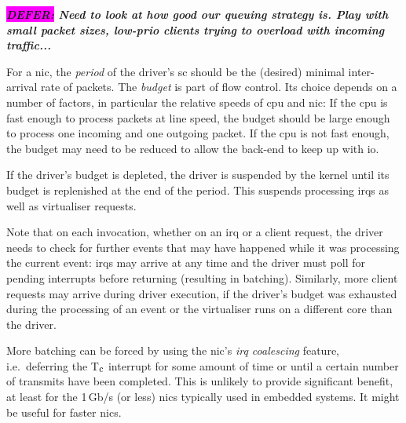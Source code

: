 \documentclass[a4paper,12pt]{report}
\newcommand{\Comment}[1]{\textbf{\textsl{#1}}}
\newcommand{\DEFER}[1]{\textbf{\textsl{\colorbox{magenta}{DEFER:} #1}}}
\newcommand{\Comment}[1]{\relax}
\newcommand{\DEFER}[1]{\relax}
\newcommand{\gernot}[1]{\Comment{#1 \colorbox{yellow}{[gernot]}}}
\newcommand{\peterc}[1]{\Comment{#1 \colorbox{yellow}{[peterc]}}}
\newcommand{\Ra}{R\(_{\mbox{\footnotesize a}}\)\xspace}
\newcommand{\Tc}{T\(_{\mbox{\footnotesize c}}\)\xspace}
\begin{document}
\DEFER{Need to look at how good our queuing strategy is. Play with
  small packet sizes, low-prio clients trying to overload with
  incoming traffic...}

For a \gls{nic}, the \emph{period} of the driver's \gls{sc} should be the (desired) minimal
inter-arrival rate of packets.
The \emph{budget} is part of flow
control. Its choice depends on a number of factors, in particular the
relative speeds of \gls{cpu} and \gls{nic}: If the \gls{cpu} is fast enough to process
packets at line speed, the budget should be large enough to process
one incoming and one outgoing packet. If the \gls{cpu} is not fast enough,
the budget may need to be reduced to allow the back-end to keep up
with \gls{io}.

If the driver's budget is depleted, the driver is suspended by the
kernel until its budget is replenished at the end of the period. This
suspends processing \glspl{irq} as well as virtualiser requests.

Note that on each invocation, whether on an \gls{irq} or a client request,
the driver needs to check for further events that may have happened
while it was processing the current event: \glspl{irq} may arrive at any time
and the driver must poll for pending interrupts before
returning (resulting in batching). Similarly, more client requests may arrive during driver
execution, if the driver's budget was exhausted during the processing
of an event or the virtualiser runs on a different core than the driver.

More batching can be forced by using the \gls{nic}'s \emph{\gls{irq} coalescing}
feature, i.e.\ deferring the \Tc interrupt for some amount of time or
until a certain number of transmits have been completed. This is
unlikely to provide significant benefit, at least for the 1\,Gb/s (or
less) \glspl{nic} typically used in embedded systems. It might be useful for
faster \glspl{nic}.

\end{document}
